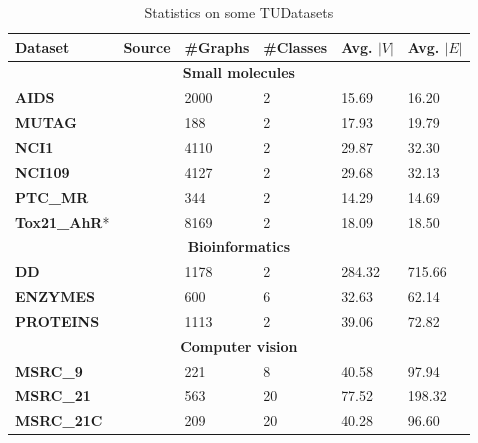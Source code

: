 			\begin{table}[H]
				\centering
				\begin{tabular}{|l|l|l|l|l|l|}
					\hline
					\textbf{Dataset} & \textbf{Source} & \textbf{\#Graphs} & \textbf{\#Classes} & \textbf{Avg. $|V|$} & \textbf{Avg. $|E|$} \\ \hline
					\multicolumn{6}{|c|}{\textbf{Small molecules}} \\ \hline
					\textbf{AIDS} & ~\cite{2008_Riesen_CONF, URL_TUDataset_NCI} & 2000 & 2 & 15.69 & 16.20 \\ \hline
					\textbf{MUTAG} & ~\cite{1991_Debnath_CONF, 2012_Kriege_CONF} & 188 & 2 & 17.93 & 19.79 \\ \hline
					\textbf{NCI1} & ~\cite{2007_Wale_CONF, 2011_Shervashidze_JMLR} & 4110 & 2 & 29.87 & 32.30 \\ \hline
					\textbf{NCI109} & ~\cite{2007_Wale_CONF, 2011_Shervashidze_JMLR} & 4127 & 2 & 29.68 & 32.13 \\ \hline
					\textbf{PTC\_MR} & ~\cite{2001_Helma_CONF, 2012_Kriege_CONF} & 344 & 2 & 14.29 & 14.69 \\ \hline
					\textbf{Tox21\_AhR}* & ~\cite{URL_TUDataset_Tox21} & 8169 & 2 & 18.09 & 18.50 \\ \hline
					\multicolumn{6}{|c|}{\textbf{Bioinformatics}} \\ \hline
					\textbf{DD} & ~\cite{2011_Shervashidze_JMLR} & 1178 & 2 & 284.32 & 715.66 \\ \hline %
					\textbf{ENZYMES} & ~\cite{2005_Borgwardt_CONF} & 600 & 6 & 32.63 & 62.14 \\ \hline %
					\textbf{PROTEINS} & ~\cite{2005_Borgwardt_CONF} & 1113 & 2 & 39.06 & 72.82 \\ \hline %
					\multicolumn{6}{|c|}{\textbf{Computer vision}} \\ \hline
					\textbf{MSRC\_9} & ~\cite{2015_Neumann_SPRINGER} & 221 & 8 & 40.58 & 97.94 \\ \hline
					\textbf{MSRC\_21} & ~\cite{2015_Neumann_SPRINGER} & 563 & 20 & 77.52 & 198.32 \\ \hline
					\textbf{MSRC\_21C} & ~\cite{2015_Neumann_SPRINGER} & 209 & 20 & 40.28 & 96.60 \\ \hline
				\end{tabular}
				\caption{Statistics on some TUDatasets}\label{tab:TUDataset_Stats}
			\end{table}			

